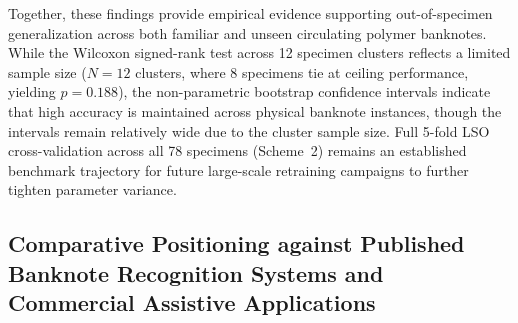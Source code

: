 \documentclass[final,5p,times,twocolumn,authoryear]{elsarticle}
\begin{document}
Together, these findings provide empirical evidence supporting out-of-specimen generalization across both familiar and unseen circulating polymer banknotes. While the Wilcoxon signed-rank test across 12 specimen clusters reflects a limited sample size ($N = 12$ clusters, where 8 specimens tie at ceiling performance, yielding $p = 0.188$), the non-parametric bootstrap confidence intervals indicate that high accuracy is maintained across physical banknote instances, though the intervals remain relatively wide due to the cluster sample size. Full 5-fold LSO cross-validation across all 78 specimens (Scheme~2) remains an established benchmark trajectory for future large-scale retraining campaigns to further tighten parameter variance.

\subsection{Comparative Positioning against Published Banknote Recognition Systems and Commercial Assistive Applications}
\label{subsec:sota_comparison}
\end{document}
